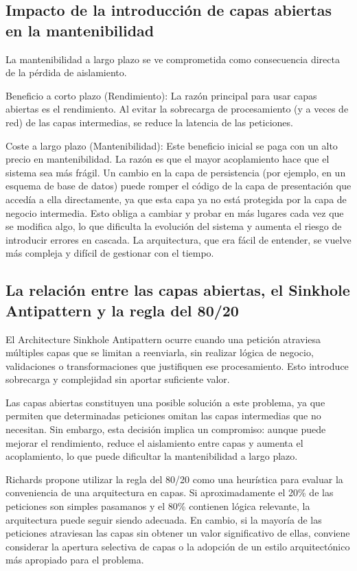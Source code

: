 \documentclass[12pt, a4paper]{article}
\begin{document}
        \subsection{Impacto de la introducción de capas abiertas en la mantenibilidad}
        La mantenibilidad a largo plazo se ve comprometida como consecuencia directa de la pérdida de aislamiento.

        Beneficio a corto plazo (Rendimiento): La razón principal para usar capas abiertas es el rendimiento. Al evitar la sobrecarga de procesamiento (y a veces de red) de las capas intermedias, se reduce la latencia de las peticiones.

        Coste a largo plazo (Mantenibilidad): Este beneficio inicial se paga con un alto precio en mantenibilidad. La razón es que el mayor acoplamiento hace que el sistema sea más frágil. Un cambio en la capa de persistencia (por ejemplo, en un esquema de base de datos) puede romper el código de la capa de presentación que accedía a ella directamente, ya que esta capa ya no está protegida por la capa de negocio intermedia. Esto obliga a cambiar y probar en más lugares cada vez que se modifica algo, lo que dificulta la evolución del sistema y aumenta el riesgo de introducir errores en cascada. La arquitectura, que era fácil de entender, se vuelve más compleja y difícil de gestionar con el tiempo.

        \subsection{La relación entre las capas abiertas, el Sinkhole Antipattern y la regla del 80/20}

        El Architecture Sinkhole Antipattern ocurre cuando una petición atraviesa múltiples capas que se limitan a reenviarla, sin realizar lógica de negocio, validaciones o transformaciones que justifiquen ese procesamiento. Esto introduce sobrecarga y complejidad sin aportar suficiente valor.

        Las capas abiertas constituyen una posible solución a este problema, ya que permiten que determinadas peticiones omitan las capas intermedias que no necesitan. Sin embargo, esta decisión implica un compromiso: aunque puede mejorar el rendimiento, reduce el aislamiento entre capas y aumenta el acoplamiento, lo que puede dificultar la mantenibilidad a largo plazo.

        Richards propone utilizar la regla del 80/20 como una heurística para evaluar la conveniencia de una arquitectura en capas. Si aproximadamente el 20\% de las peticiones son simples pasamanos y el 80\% contienen lógica relevante, la arquitectura puede seguir siendo adecuada. En cambio, si la mayoría de las peticiones atraviesan las capas sin obtener un valor significativo de ellas, conviene considerar la apertura selectiva de capas o la adopción de un estilo arquitectónico más apropiado para el problema.
\end{document}
